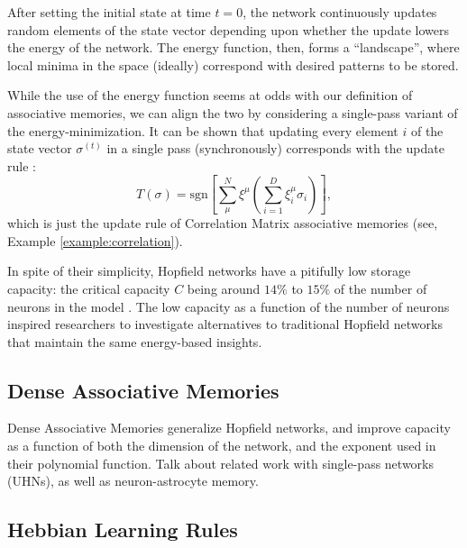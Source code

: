 \documentclass{article}
\theoremstyle{definition}
\begin{document}
After setting the initial state at time $t=0$, the network
continuously updates random
elements of the state vector depending upon whether the update lowers
the energy of the
network. The energy function, then, forms a ``landscape'', where
local minima in the space
(ideally) correspond with desired patterns to be stored.

While the use of the energy function seems at odds with our definition
of associative memories, we can align the two by considering a
single-pass variant of the energy-minimization. It can be shown
that updating every element $i$ of the state vector $\sigma^{(t)}$
in a single pass (synchronously) corresponds with the update rule
\parencite{krotov_modern_2025}:
\begin{equation}
  T(\sigma) = \text{sgn} \left[ \sum^N_\mu \xi^\mu \left(
  \sum^D_{i=1} \xi^\mu_i \sigma_i \right) \right],
\end{equation}
which is just the update rule of Correlation Matrix associative memories
(see, Example \ref{example:correlation}).

In spite of their simplicity, Hopfield networks have a pitifully low
storage capacity: the critical capacity $C$ being around $14\%$ to $15\%$
of the number of neurons in the model
\parencites{amit_statistical_1987,hopfield_neural_1982}. The low capacity
as a function of the number of neurons inspired researchers to investigate
alternatives to traditional Hopfield networks that maintain the same 
energy-based insights.

\subsection{Dense Associative Memories}\label{sec:dense-associative-memory}

Dense Associative Memories generalize Hopfield networks, and improve
capacity as a function of both the dimension of the network, and the
exponent used in their polynomial function. Talk about related
work with single-pass networks (UHNs), as well as neuron-astrocyte memory.

\subsection{Hebbian Learning Rules}\label{sec:hebbian-learning-rules}
\end{document}

